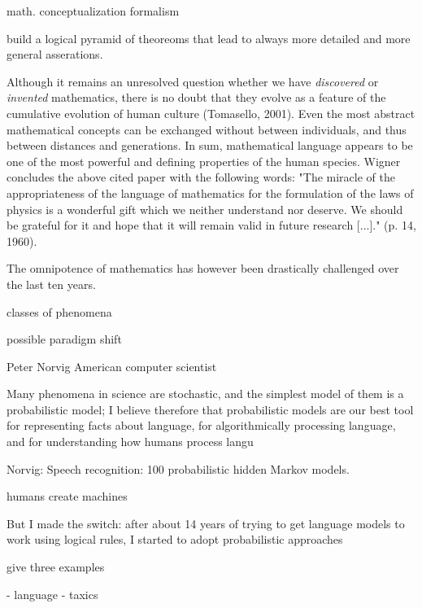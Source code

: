 \documentclass[authoryear,review,3p]{elsarticle}
\begin{document}
math. conceptualization
formalism

build a logical pyramid of theoreoms that lead to always
more detailed and more general asserations.


Although it remains an unresolved question whether we have
\textit{discovered} or \textit{invented} mathematics,
there is no doubt
that they
evolve as a feature of the cumulative evolution
of human culture (Tomasello, 2001).
Even the most abstract mathematical concepts can
be exchanged without between individuals,
and thus between distances and generations.
In sum, mathematical language
appears to be one of the most
powerful and defining properties of the human species.
Wigner concludes the above cited paper with the following words:
"The miracle of the appropriateness of the language of mathematics
for the formulation of the laws of physics is a wonderful gift
which we neither understand nor deserve. We should be grateful for
it and hope that it will remain valid in future research [...]."
(p. 14, 1960).




The omnipotence of mathematics has however been drastically challenged
over the last ten years.


classes of phenomena

possible paradigm shift

Peter Norvig 
American computer scientist


Many phenomena in science are stochastic, and the simplest model of them is a probabilistic model; I believe therefore that probabilistic models are our best tool for representing facts about language, for algorithmically processing language, and for understanding how humans process langu

Norvig:
Speech recognition: 100%
probabilistic hidden Markov models.

humans create machines

But I made the switch: after about 14 years of trying to get language models to work using logical rules, I started to adopt probabilistic approaches


give three examples

- language
- taxics
\end{document}
